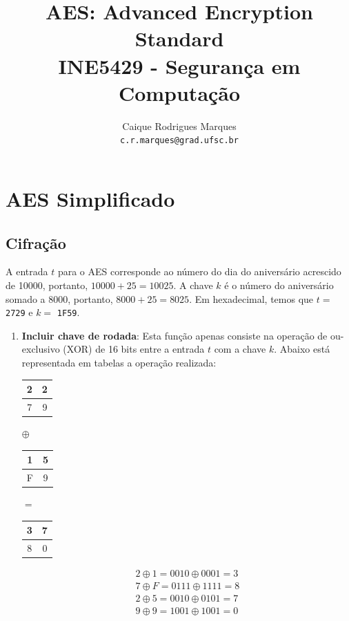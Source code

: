 \documentclass{article}
\title{\textbf{AES: Advanced Encryption Standard \\
        \large INE5429 - Segurança em Computação}}
\author{
    Caique Rodrigues Marques \\
    {\texttt{c.r.marques@grad.ufsc.br}}
}
\date{}
\begin{document}
\maketitle

\section{AES Simplificado}
\subsection{Cifração}
A entrada $t$ para o AES corresponde ao número do dia do aniversário acrescido
de 10000, portanto, $10000 + 25 = 10025$. A chave $k$ é o número do aniversário
somado a 8000, portanto, $8000 + 25 = 8025$. Em hexadecimal, temos que $t =$
\texttt{2729} e $k =$ \texttt{1F59}.
\begin{enumerate}
    \item \textbf{Incluir chave de rodada}: Esta função apenas consiste na
    operação de ou-exclusivo (XOR) de 16 bits entre a entrada $t$ com a chave
    $k$. Abaixo está representada em tabelas a operação realizada:
    \begin{center}
        \begin{tabular}{|c|c|}
            \hline
            2 & 2  \\
            \hline
            7 & 9 \\
            \hline
        \end{tabular}
        $\oplus$
        \begin{tabular}{|c|c|}
            \hline
            1 & 5  \\
            \hline
            F & 9 \\
            \hline
        \end{tabular}
        $=$
        \begin{tabular}{|c|c|}
            \hline
            3 & 7  \\
            \hline
            8 & 0 \\
            \hline
        \end{tabular}
    \end{center}
    \begin{gather*}
        2 \oplus 1 = 0010 \oplus 0001 = 3 \\
        7 \oplus F = 0111 \oplus 1111 = 8 \\
        2 \oplus 5 = 0010 \oplus 0101 = 7 \\
        9 \oplus 9 = 1001 \oplus 1001 = 0 \\
    \end{gather*}
    

\end{enumerate}
\end{document}
